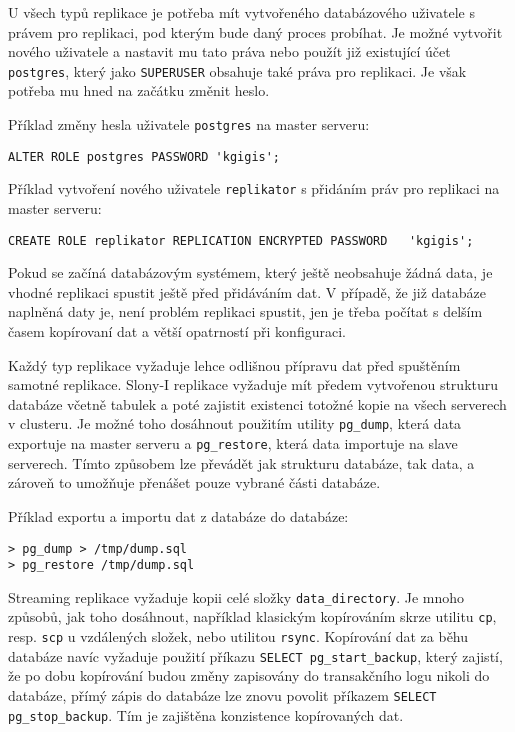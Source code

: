       U všech typů replikace je potřeba mít vytvořeného databázového uživatele s právem pro replikaci, pod kterým bude daný proces probíhat. Je možné vytvořit nového uživatele a nastavit mu tato práva nebo použít již existující účet \texttt{postgres}, který jako \texttt{SUPERUSER} obsahuje také práva pro replikaci. Je však potřeba mu hned na začátku změnit heslo.

Příklad změny hesla uživatele \texttt{postgres} na master serveru:
\begin{lstlisting}
ALTER ROLE postgres PASSWORD 'kgigis';
\end{lstlisting}

Příklad vytvoření nového uživatele \texttt{replikator} s přidáním práv pro replikaci na master serveru: 
\begin{lstlisting}[]
CREATE ROLE replikator REPLICATION ENCRYPTED PASSWORD   'kgigis';
\end{lstlisting}

Pokud se začíná databázovým systémem, který ještě neobsahuje žádná data, je vhodné replikaci spustit ještě před přidáváním dat. V případě, že již databáze naplněná daty je, není problém replikaci spustit, jen je třeba počítat s delším časem kopírovaní dat a větší opatrností při konfiguraci. 

Každý typ replikace vyžaduje lehce odlišnou přípravu dat před spuštěním samotné replikace. 
Slony-I replikace vyžaduje mít předem vytvořenou strukturu databáze včetně tabulek a poté zajistit existenci totožné kopie na všech serverech v clusteru. Je možné toho dosáhnout použitím utility \texttt{pg\_dump}, která data exportuje na master serveru a \texttt{pg\_restore}, která data importuje na slave serverech. Tímto způsobem lze převádět jak strukturu databáze, tak data, a zároveň to umožňuje přenášet pouze vybrané části databáze. 

Příklad exportu a importu dat z databáze do databáze:
\begin{lstlisting}[keywordstyle=\color{purpurova7},identifierstyle=\color{black},stringstyle=\color{black}]
> pg_dump > /tmp/dump.sql
> pg_restore /tmp/dump.sql
\end{lstlisting}

Streaming replikace vyžaduje kopii celé složky \texttt{data\_directory}. Je mnoho způsobů, jak toho dosáhnout, například klasickým kopírováním skrze utilitu \texttt{cp}, resp. \texttt{scp} u vzdálených složek, nebo utilitou \texttt{rsync}. Kopírování dat za běhu databáze navíc vyžaduje použití příkazu \texttt{SELECT pg\_start\_backup}, který zajistí, že po dobu kopírování budou změny zapisovány do transakčního logu nikoli do databáze, přímý zápis do databáze lze znovu povolit příkazem \texttt{SELECT pg\_stop\_backup}. Tím je zajištěna konzistence kopírovaných dat. 

